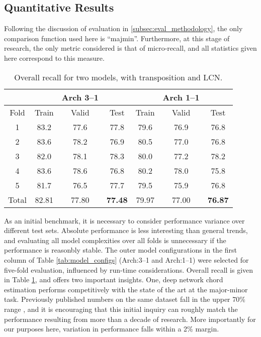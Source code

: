 \subsection{Quantitative Results}
\label{subsec:quantitative_results}

Following the discussion of evaluation in \ref{subsec:eval_methodology}, the only comparison function used here is ``majmin''.
Furthermore, at this stage of research, the only metric considered is that of micro-recall, and all statistics given here correspond to this measure.


\begin{table}[!t]
\caption{Overall recall for two models, with transposition and LCN.}
\label{table:exp1res}
\centering
\begin{tabular}{c || c c c || c c c |}
 & & Arch 3--1 & & & Arch 1--1 & \\
 \hline
Fold & Train & Valid & Test & Train & Valid & Test \\
\hline
1 & 83.2 & 77.6 & 77.8 &  79.6 & 76.9 & 76.8 \\
2 & 83.6 & 78.2 & 76.9 & 80.5 & 77.0 & 76.8 \\
3 & 82.0 & 78.1 & 78.3 & 80.0 & 77.2 & 78.2\\
4 & 83.6 & 78.6 & 76.8 & 80.2 & 78.0 & 75.8 \\
5 & 81.7 & 76.5 & 77.7 & 79.5 & 75.9 & 76.8 \\
\hline
Total &  82.81 & 77.80 & \textbf{77.48} & 79.97 & 77.00 & \textbf{76.87}\\
\hline
\end{tabular}
\end{table}

As an initial benchmark, it is necessary to consider performance variance over different test sets.
Absolute performance is less interesting than general trends, and evaluating all model complexities over all folds is unnecessary if the performance is reasonbly stable.
The outer model configurations in the first column of Table \ref{tab:model_configs} (Arch:3--1 and Arch:1--1) were selected for five-fold evaluation, influenced by run-time considerations.
Overall recall is given in Table \ref{table:exp1res}, and offers two important insights.
One, deep network chord estimation performs competitively with the state of the art at the major-minor task.
Previously published numbers on the same dataset fall in the upper 70\% range \cite{Cho2011}, and it is encouraging that this initial inquiry can roughly match the performance resulting from more than a decade of research.
More importantly for our purposes here, variation in performance falls within a 2\% margin.

